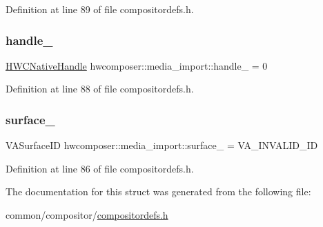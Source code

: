 Definition at line 89 of file compositordefs.\+h.

\mbox{\label{structhwcomposer_1_1media__import_ab43515fb27f0e91598d906ae81acb6cd}} 
\subsubsection{\texorpdfstring{handle\+\_\+}{handle\_}}
{\footnotesize\ttfamily \mbox{\hyperlink{alios_2platformdefines_8h_ac0a2eaf260f556d17fe489911f017bdf}{H\+W\+C\+Native\+Handle}} hwcomposer\+::media\+\_\+import\+::handle\+\_\+ = 0}



Definition at line 88 of file compositordefs.\+h.

\mbox{\label{structhwcomposer_1_1media__import_af82420941f64a848639e0ac80a7b2861}} 
\subsubsection{\texorpdfstring{surface\+\_\+}{surface\_}}
{\footnotesize\ttfamily V\+A\+Surface\+ID hwcomposer\+::media\+\_\+import\+::surface\+\_\+ = V\+A\+\_\+\+I\+N\+V\+A\+L\+I\+D\+\_\+\+ID}



Definition at line 86 of file compositordefs.\+h.



The documentation for this struct was generated from the following file\+:\begin{DoxyCompactItemize}
\item 
common/compositor/\mbox{\hyperlink{compositordefs_8h}{compositordefs.\+h}}\end{DoxyCompactItemize}
